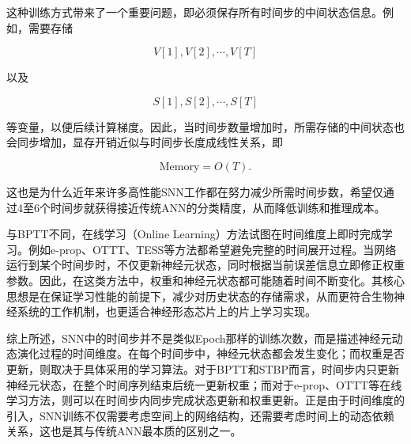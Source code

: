\documentclass[journal,12pt,onecolumn]{IEEEtran}
\begin{document}
这种训练方式带来了一个重要问题，即必须保存所有时间步的中间状态信息。例如，需要存储

\begin{equation}
V[1],V[2],\cdots,V[T]
\end{equation}

以及

\begin{equation}
S[1],S[2],\cdots,S[T]
\end{equation}

等变量，以便后续计算梯度。因此，当时间步数量增加时，所需存储的中间状态也会同步增加，显存开销近似与时间步长度成线性关系，即

\begin{equation}
\text{Memory} = O(T).
\end{equation}

这也是为什么近年来许多高性能SNN工作都在努力减少所需时间步数，希望仅通过4至6个时间步就获得接近传统ANN的分类精度，从而降低训练和推理成本。

与BPTT不同，在线学习（Online Learning）方法试图在时间维度上即时完成学习。例如e-prop、OTTT、TESS等方法都希望避免完整的时间展开过程。当网络运行到某个时间步时，不仅更新神经元状态，同时根据当前误差信息立即修正权重参数。因此，在这类方法中，权重和神经元状态都可能随着时间不断变化。其核心思想是在保证学习性能的前提下，减少对历史状态的存储需求，从而更符合生物神经系统的工作机制，也更适合神经形态芯片上的片上学习实现。

综上所述，SNN中的时间步并不是类似Epoch那样的训练次数，而是描述神经元动态演化过程的时间维度。在每个时间步中，神经元状态都会发生变化；而权重是否更新，则取决于具体采用的学习算法。对于BPTT和STBP而言，时间步内只更新神经元状态，在整个时间序列结束后统一更新权重；而对于e-prop、OTTT等在线学习方法，则可以在时间步内同步完成状态更新和权重更新。正是由于时间维度的引入，SNN训练不仅需要考虑空间上的网络结构，还需要考虑时间上的动态依赖关系，这也是其与传统ANN最本质的区别之一。
\end{document}
